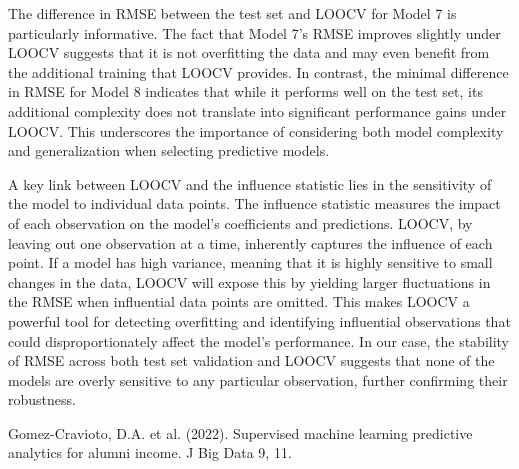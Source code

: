 \documentclass[11pt,a4paper,onecolumn]{article}
\begin{document}
        The difference in RMSE between the test set and LOOCV for Model 7 is particularly informative. The fact that Model 7's RMSE improves slightly under LOOCV suggests that it is not overfitting the data and may even benefit from the additional training that LOOCV provides. In contrast, the minimal difference in RMSE for Model 8 indicates that while it performs well on the test set, its additional complexity does not translate into significant performance gains under LOOCV. This underscores the importance of considering both model complexity and generalization when selecting predictive models.
        
        A key link between LOOCV and the influence statistic lies in the sensitivity of the model to individual data points. The influence statistic measures the impact of each observation on the model's coefficients and predictions. LOOCV, by leaving out one observation at a time, inherently captures the influence of each point. If a model has high variance, meaning that it is highly sensitive to small changes in the data, LOOCV will expose this by yielding larger fluctuations in the RMSE when influential data points are omitted. This makes LOOCV a powerful tool for detecting overfitting and identifying influential observations that could disproportionately affect the model’s performance. In our case, the stability of RMSE across both test set validation and LOOCV suggests that none of the models are overly sensitive to any particular observation, further confirming their robustness.
    
    





\pagebreak
\singlespacing

Gomez-Cravioto, D.A. et al. (2022). Supervised machine learning predictive analytics for alumni income. J Big Data 9, 11.
\pagebreak
\end{document}
